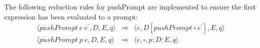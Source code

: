 The following reduction rules for pushPrompt are implemented to ensure the first expression has been evaluated to a prompt:
\[
  \begin{array}{lcl}
    \langle pushPrompt\ e\ e^\prime, D, E, q \rangle &\Rightarrow &\langle e, D[pushPrompt\ \square\ e^\prime], E, q \rangle \\
    \langle pushPrompt\ p\ e, D, E, q \rangle &\Rightarrow &\langle e, \square, p : D : E, q \rangle \\
  \end{array}
\]
\begin{comment}
eval (State (PushPrompt e e') d es q) = case e of
  Val _ -> State e' Hole (e:d:es) q
  otherwise -> case d of
    Hole -> State e (PushPrompt Hole e') es q
    otherwise -> State e (ret d (PushPrompt Hole e')) es q
\end{comment}
\begin{Shaded}
\begin{Highlighting}[]
 \NormalTok{(} \FunctionTok{=}  
   \NormalTok{_ }\OtherTok{->}   \FunctionTok{:}\FunctionTok{:}
  \OtherTok{->}  
     \OtherTok{->}    
    \OtherTok{->}    
\end{Highlighting}
\end{Shaded}

